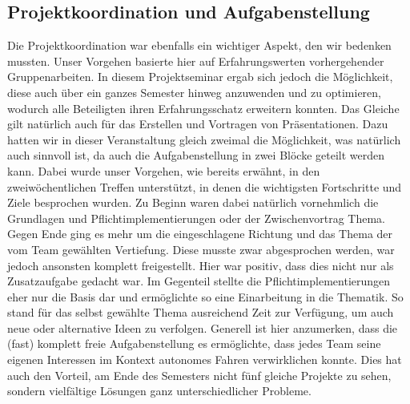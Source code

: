 \subsection{Projektkoordination und Aufgabenstellung}
Die Projektkoordination war ebenfalls ein wichtiger Aspekt, den wir bedenken mussten. Unser Vorgehen basierte hier auf Erfahrungswerten vorhergehender Gruppenarbeiten. In diesem Projektseminar ergab sich jedoch die Möglichkeit, diese auch über ein ganzes Semester hinweg anzuwenden und zu optimieren, wodurch alle Beteiligten ihren Erfahrungsschatz erweitern konnten. Das Gleiche gilt natürlich auch für das Erstellen und Vortragen von Präsentationen. Dazu hatten wir in dieser Veranstaltung gleich zweimal die Möglichkeit, was natürlich auch sinnvoll ist, da auch die Aufgabenstellung in zwei Blöcke geteilt werden kann. Dabei wurde unser Vorgehen, wie bereits erwähnt, in den zweiwöchentlichen Treffen unterstützt, in denen die wichtigsten Fortschritte und Ziele besprochen wurden. Zu Beginn waren dabei natürlich vornehmlich die Grundlagen und Pflichtimplementierungen oder der Zwischenvortrag Thema. Gegen Ende ging es mehr um die eingeschlagene Richtung und das Thema der vom Team gewählten Vertiefung. Diese musste zwar abgesprochen werden, war jedoch ansonsten komplett freigestellt. Hier war positiv, dass dies nicht nur als Zusatzaufgabe gedacht war. Im Gegenteil stellte die Pflichtimplementierungen eher nur die Basis dar und ermöglichte so eine Einarbeitung in die Thematik. So stand für das selbst gewählte Thema ausreichend Zeit zur Verfügung, um auch neue oder alternative Ideen zu verfolgen.
\newline
Generell ist hier anzumerken, dass die (fast) komplett freie Aufgabenstellung es ermöglichte, dass jedes Team seine eigenen  Interessen im Kontext autonomes Fahren verwirklichen konnte. Dies hat auch den Vorteil, am Ende des Semesters nicht fünf gleiche Projekte zu sehen, sondern vielfältige Lösungen ganz unterschiedlicher Probleme.

